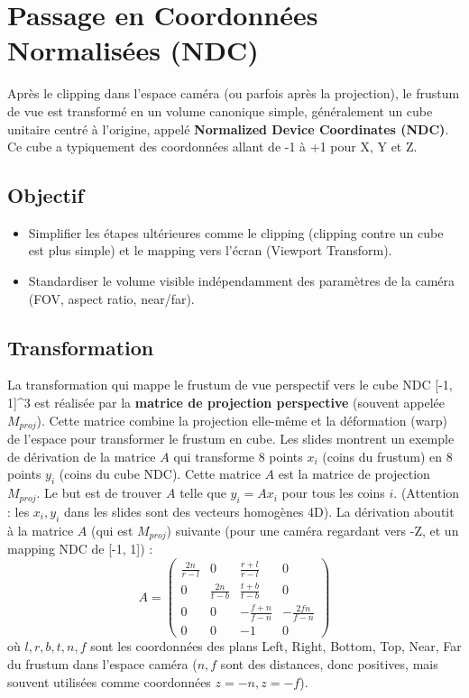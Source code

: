 \section{Passage en Coordonnées Normalisées (NDC)}
Après le clipping dans l'espace caméra (ou parfois après la projection), le frustum de vue est transformé en un volume canonique simple, généralement un cube unitaire centré à l'origine, appelé \textbf{Normalized Device Coordinates (NDC)}. Ce cube a typiquement des coordonnées allant de -1 à +1 pour X, Y et Z.
\subsection{Objectif}
\begin{itemize}
    \item Simplifier les étapes ultérieures comme le clipping (clipping contre un cube est plus simple) et le mapping vers l'écran (Viewport Transform).
    \item Standardiser le volume visible indépendamment des paramètres de la caméra (FOV, aspect ratio, near/far).
\end{itemize}
\subsection{Transformation}
La transformation qui mappe le frustum de vue perspectif vers le cube NDC [-1, 1]^3 est réalisée par la \textbf{matrice de projection perspective} (souvent appelée \( M_{proj} \)). Cette matrice combine la projection elle-même et la déformation (warp) de l'espace pour transformer le frustum en cube.
Les slides montrent un exemple de dérivation de la matrice \( A \) qui transforme 8 points \( x_i \) (coins du frustum) en 8 points \( y_i \) (coins du cube NDC). Cette matrice \( A \) est la matrice de projection \( M_{proj} \). Le but est de trouver \( A \) telle que \( y_i = A x_i \) pour tous les coins \( i \). (Attention : les \( x_i, y_i \) dans les slides sont des vecteurs homogènes 4D).
La dérivation aboutit à la matrice \( A \) (qui est \( M_{proj} \)) suivante (pour une caméra regardant vers -Z, et un mapping NDC de [-1, 1]) :
\[ A = \begin{pmatrix}
\frac{2n}{r-l} & 0 & \frac{r+l}{r-l} & 0 \\
0 & \frac{2n}{t-b} & \frac{t+b}{t-b} & 0 \\
0 & 0 & -\frac{f+n}{f-n} & -\frac{2fn}{f-n} \\
0 & 0 & -1 & 0
\end{pmatrix} \]
où \( l, r, b, t, n, f \) sont les coordonnées des plans Left, Right, Bottom, Top, Near, Far du frustum dans l'espace caméra (\( n, f \) sont des distances, donc positives, mais souvent utilisées comme coordonnées \( z=-n, z=-f \)).
